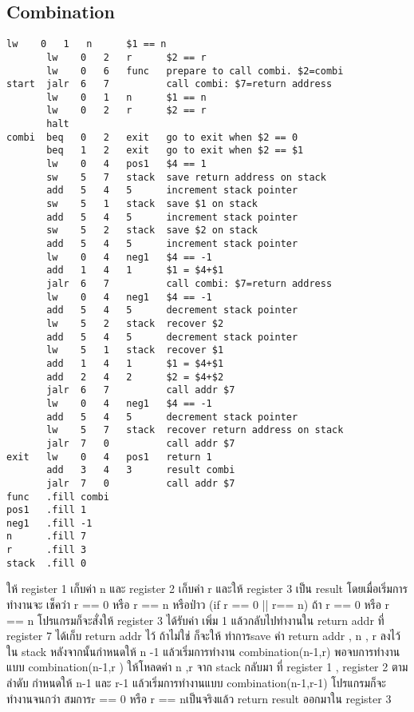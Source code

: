 \documentclass[14pt]{article}
\begin{document}
\subsection{Combination}
\begin{lstlisting}[style=assembly]
       lw    0   1   n      $1 == n 
       lw    0   2   r      $2 == r
       lw    0   6   func   prepare to call combi. $2=combi 
start  jalr  6   7          call combi: $7=return address
       lw    0   1   n      $1 == n
       lw    0   2   r      $2 == r
       halt
combi  beq   0   2   exit   go to exit when $2 == 0
       beq   1   2   exit   go to exit when $2 == $1
       lw    0   4   pos1   $4 == 1
       sw    5   7   stack  save return address on stack
       add   5   4   5      increment stack pointer
       sw    5   1   stack  save $1 on stack
       add   5   4   5      increment stack pointer
       sw    5   2   stack  save $2 on stack
       add   5   4   5      increment stack pointer
       lw    0   4   neg1   $4 == -1
       add   1   4   1      $1 = $4+$1
       jalr  6   7          call combi: $7=return address
       lw    0   4   neg1   $4 == -1
       add   5   4   5      decrement stack pointer
       lw    5   2   stack  recover $2
       add   5   4   5      decrement stack pointer
       lw    5   1   stack  recover $1
       add   1   4   1      $1 = $4+$1
       add   2   4   2      $2 = $4+$2
       jalr  6   7          call addr $7
       lw    0   4   neg1   $4 == -1
       add   5   4   5      decrement stack pointer
       lw    5   7   stack  recover return address on stack
       jalr  7   0          call addr $7
exit   lw    0   4   pos1   return 1
       add   3   4   3      result combi
       jalr  7   0          call addr $7
func   .fill combi
pos1   .fill 1
neg1   .fill -1
n      .fill 7
r      .fill 3
stack  .fill 0    
\end{lstlisting}
\par ให้ register 1 เก็บค่า n และ register 2 เก็บค่า r  และให้ register 3 เป็น result 
โดยเมื่อเริ่มการทำงานจะ เช็คว่า r == 0 หรือ r == n หรือป่าว  (if r == 0 || r== n)
ถ้า r == 0 หรือ r == n  โปรแกรมก็จะสั่งให้ register 3 ได้รับค่า เพิ่ม 1 แล้วกลับไปทำงานใน return addr ที่ register 7 ได้เก็บ return addr ไว้ 
ถ้าไม่ใช่ ก็จะให้ ทำการsave ค่า return addr , n , r ลงไว้ใน stack หลังจากนั้นกำหนดให้ n -1 แล้วเริ่มการทำงาน combination(n-1,r)
พอจบการทำงานแบบ combination(n-1,r ) ให้โหลดค่า n ,r   จาก stack กลับมา ที่ register 1 , register 2 ตาม ลำดับ 
กำหนดให้ n-1 และ r-1 แล้วเริ่มการทำงานแบบ combination(n-1,r-1) โปรแกรมก็จะทำงานจนกว่า สมการr == 0 หรือ r == nเป็นจริงแล้ว return result ออกมาใน register 3
\end{document}
